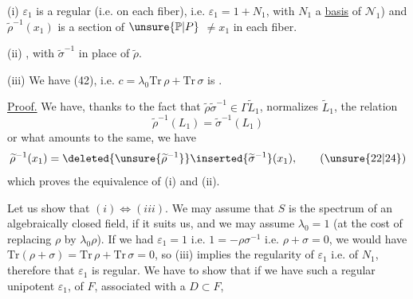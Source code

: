 (i) $\varepsilon_1$ is  a regular  (i.e.   on each fiber), i.e. $\varepsilon_1=1+N_1$, with $N_1$ a \uline{basis} of $\mathcal N_1$) and $\widetilde\rho^{-1}(x_1)$ is a section of $\unsure{\mathbb P|P}$  $\ne x_1$ in each fiber.


(ii) , with $\widetilde\sigma^{-1}$ in place of $\widetilde\rho$.


(iii) We have (42), i.e. $c=\lambda_0\mathrm{Tr}\,\rho+\mathrm{Tr}\,\sigma$ is .

\uline{Proof.} We have, thanks to the fact that $\widetilde\rho\widetilde\sigma^{-1}\in\Gamma\widetilde L_1$, normalizes $\widetilde L_1$,  the relation
\[
\widetilde\rho^{-1}(L_1)=\widetilde\sigma^{-1}(L_1)
\]
or what amounts to the same, we have
\[
\widetilde\rho^{-1}(x_1)=\deleted{\unsure{\widetilde\rho^{-1}}}\inserted{\widetilde\sigma^{-1}}(x_1), \tag{\unsure{22|24}}
\]
which proves the equivalence of (i) and (ii).

Let us show that $(i)\Longleftrightarrow(iii)$. We may assume that $S$ is the spectrum of an algebraically closed field, if it suits us, and we may assume $\lambda_0=1$ (at the cost  of replacing $\rho$ by $\lambda_0\rho$). If we had $\varepsilon_1=1$ i.e. \deleted{$\rho+\sigma$} $1=-\rho\sigma^{-1}$ i.e. $\rho+\sigma=0$, we would have  $\mathrm{Tr}(\rho+\sigma)=\mathrm{Tr}\,\rho+\mathrm{Tr}\,\sigma=0$, so (iii) implies the regularity of $\varepsilon_1$ i.e. of $N_1$,   therefore that $\varepsilon_1$ is regular. We have to show that if we have such a regular unipotent   $\varepsilon_1$, of $F$, associated with a $D\subset F$,


